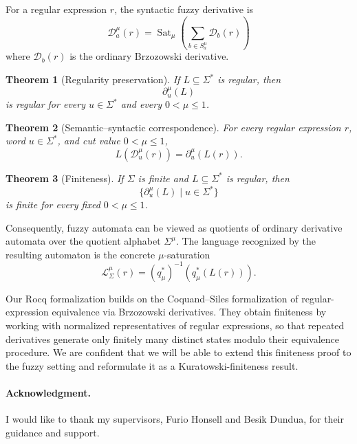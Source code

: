 \documentclass{easychair}
\newtheorem{theorem}{Theorem}
\begin{document}
For a regular expression $r$, the syntactic fuzzy derivative is
\[
\mathcal D_a^\mu(r)
=
\operatorname{Sat}_\mu
\left(
\sum_{b\in S_a^\mu}\mathcal D_b(r)
\right)
\]
where $\mathcal D_b(r)$ is the ordinary Brzozowski derivative.

\begin{theorem}[Regularity preservation]
If $L\subseteq\Sigma^\ast$ is regular, then
\[
\partial_u^\mu(L)
\]
is regular for every $u\in\Sigma^\ast$ and every $0<\mu\le1$.
\end{theorem}

\begin{theorem}[Semantic--syntactic correspondence]
For every regular expression $r$, word $u\in\Sigma^\ast$, and cut value
$0<\mu\le1$,
\[
L(\mathcal D_u^\mu(r))
=
\partial_u^\mu(L(r)).
\]
\end{theorem}

\begin{theorem}[Finiteness]
If $\Sigma$ is finite and $L\subseteq\Sigma^\ast$ is regular, then
\[
\{\partial_u^\mu(L)\mid u\in\Sigma^\ast\}
\]
is finite for every fixed $0<\mu\le1$.
\end{theorem}

Consequently, fuzzy automata can be viewed as quotients of ordinary derivative
automata over the quotient alphabet $\Sigma^\mu$. The language recognized by
the resulting automaton is the concrete $\mu$-saturation
\[
\mathcal L_\Sigma^\mu(r)
=
(q_\mu^\ast)^{-1}(q_\mu^\ast(L(r))).
\]

Our Rocq formalization builds on the Coquand--Siles formalization of
regular-expression equivalence via Brzozowski derivatives. They obtain finiteness by working with normalized representatives of regular
expressions, so that repeated derivatives generate only finitely many distinct
states modulo their equivalence procedure. 
We are confident that we will be able to  extend this finiteness proof to the fuzzy setting and reformulate
it as a Kuratowski-finiteness result. 


{\small
\paragraph{Acknowledgment.}
I would like to thank my supervisors, Furio Honsell and Besik Dundua, for their guidance and support.
}


\end{document}
